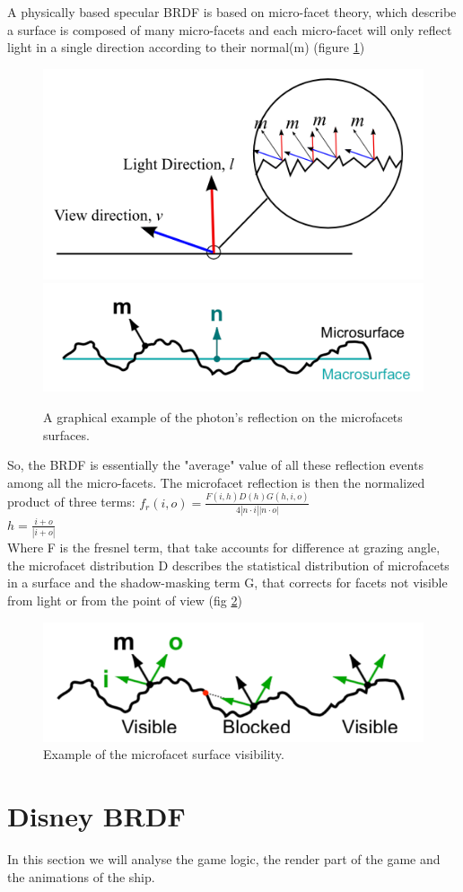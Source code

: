 \documentclass[11pt]{article}
\begin{document}
A physically based specular BRDF is based on micro-facet theory, which describe a surface is composed of many micro-facets and each micro-facet will only reflect light in a single direction according to their normal(m) (figure \ref{fig:microfacet}) \cite{slide,microfacet} 

\begin{figure}
	\centering
	\includegraphics[width=0.5\linewidth]{img/microfacet}
	\includegraphics[width=0.5\linewidth]{img/microfacet2}
	\caption{A graphical example of the photon's reflection on the microfacets surfaces.}
	\label{fig:microfacet}
\end{figure}

So, the BRDF is essentially the "average" value of all these reflection events among all the micro-facets.
The microfacet reflection is then the normalized product of three terms:
$f_r(i,o)=\frac{F(i,h)D(h)G(h,i,o)}{4|n\cdot i||n\cdot o|}$\\
$h= \frac{i+o}{|i+o|}$ \\
Where F is the fresnel term, that take accounts for difference at grazing angle, the microfacet distribution D describes the statistical distribution of microfacets in a surface and the shadow-masking term G, that corrects for facets not visible from light or from the point of view (fig \ref{fig:visible})

\begin{figure}
	\centering
	\includegraphics[width=0.5\linewidth]{img/visible}
	\caption{Example of the microfacet surface visibility.}
	\label{fig:visible}
\end{figure}


\section{Disney BRDF}
In this section we will analyse the game logic, the render part of the game and the animations of the ship. 
\end{document}
